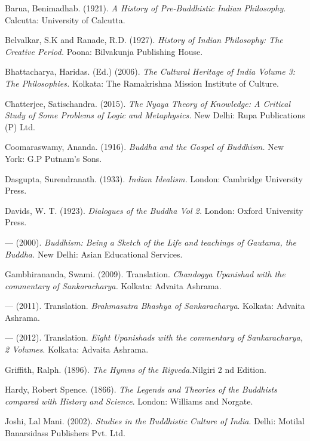 \begin{thebibliography}{99}
\itemsep=1pt
 Barua, Benimadhab. (1921).\textit{ A History of Pre-Buddhistic Indian Philosophy}. Calcutta: University of Calcutta.

  Belvalkar, S.K and Ranade, R.D. (1927). \textit{History of Indian Philosophy: The Creative Period.} Poona: Bilvakunja Publishing House.

  Bhattacharya, Haridas. (Ed.) (2006). \textit{The Cultural Heritage of India Volume 3: The Philosophies.} Kolkata: The Ramakrishna Mission Institute of Culture.

  Chatterjee, Satischandra. (2015). \textit{The Nyaya Theory of Knowledge: A Critical Study of Some Problems of Logic and Metaphysics.} New Delhi: Rupa Publications (P) Ltd.

  Coomaraswamy, Ananda. (1916). \textit{Buddha and the Gospel of Buddhism.} New York: G.P Putnam’s Sons.

  Dasgupta, Surendranath. (1933).\textit{ Indian Idealism.} London: Cambridge University Press.

  Davids, W. T. (1923). \textit{Dialogues of the Buddha Vol 2.} London: Oxford University Press.

  — (2000). \textit{Buddhism: Being a Sketch of the Life and teachings of Gautama, the Buddha.} New Delhi: Asian Educational Services.

  Gambhirananda, Swami. (2009). Translation. \textit{Chandogya Upanishad with the commentary of Sankaracharya.} Kolkata: Advaita Ashrama.

  — (2011). Translation. \textit{Brahmasutra Bhashya of Sankaracharya}. Kolkata: Advaita Ashrama.

  — (2012). Translation. \textit{Eight Upanishads with the commentary of Sankaracharya, 2 Volumes}. Kolkata: Advaita Ashrama.

  Griffith, Ralph. (1896). \textit{The Hymns of the Rigveda.}Nilgiri 2 nd Edition.

  Hardy, Robert Spence. (1866). \textit{The Legends and Theories of the Buddhists compared with History and Science}. London: Williams and Norgate.

  Joshi, Lal Mani. (2002). \textit{Studies in the Buddhistic Culture of India}. Delhi: Motilal Banarsidass Publishers Pvt. Ltd.


\end{thebibliography}
